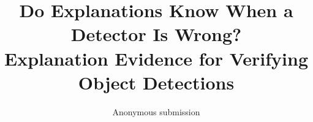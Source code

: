 \documentclass[10pt,twocolumn,letterpaper]{article}
\title{Do Explanations Know When a Detector Is Wrong?\\
Explanation Evidence for Verifying Object Detections}
\author{Anonymous submission}
\date{}
\begin{document}
\maketitle




{\small


}
\end{document}
